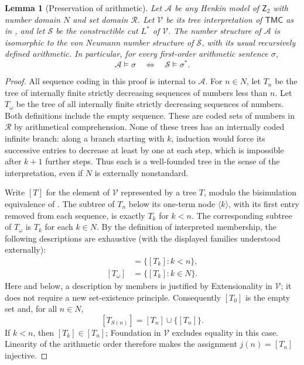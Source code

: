 \documentclass[11pt,a4paper]{article}
\numberwithin{equation}{section}
\newtheorem{lemma}[theorem]{Lemma}
\theoremstyle{definition}
\theoremstyle{remark}
\newcommand{\Ztwo}{\mathsf{Z}_2}
\begin{document}
\begin{lemma}[Preservation of arithmetic]\label{lem:arithmetic-preservation}
Let $\mathcal A$ be any Henkin model of $\Ztwo$ with number domain $N$ and set domain $\mathcal R$. Let $\mathcal V$ be its tree interpretation of $\mathsf{TMC}$ as in \cite[Definition 5.1 and Theorem 5.2]{kl}, and let $\mathcal S$ be the constructible cut $L^*$ of $\mathcal V$. The number structure of $\mathcal A$ is isomorphic to the von Neumann number structure of $\mathcal S$, with its usual recursively defined arithmetic. In particular, for every first-order arithmetic sentence $\sigma$,
\[
\mathcal A\models\sigma
\quad\Longleftrightarrow\quad
\mathcal S\models\sigma^*.
\]
\end{lemma}
\begin{proof}
All sequence coding in this proof is internal to $\mathcal A$. For $n\in N$, let $T_n$ be the tree of internally finite strictly decreasing sequences of numbers less than $n$. Let $T_\omega$ be the tree of all internally finite strictly decreasing sequences of numbers. Both definitions include the empty sequence. These are coded sets of numbers in $\mathcal R$ by arithmetical comprehension. None of these trees has an internally coded infinite branch: along a branch starting with $k$, induction would force its successive entries to decrease at least by one at each step, which is impossible after $k+1$ further steps. Thus each is a well-founded tree in the sense of the interpretation, even if $N$ is externally nonstandard.

Write $[T]$ for the element of $\mathcal V$ represented by a tree $T$, modulo the bisimulation equivalence of \cite[Definition 5.1]{kl}. The subtree of $T_n$ below its one-term node $\langle k\rangle$, with its first entry removed from each sequence, is exactly $T_k$ for $k<n$. The corresponding subtree of $T_\omega$ is $T_k$ for each $k\in N$. By the definition of interpreted membership, the following descriptions are exhaustive (with the displayed families understood externally):
\begin{align*}
[T_n]&=\{[T_k]: k<n\},\\
[T_\omega]&=\{[T_k]: k\in N\}.
\end{align*}
Here and below, a description by members is justified by Extensionality in $\mathcal V$; it does not require a new set-existence principle. Consequently $[T_0]$ is the empty set and, for all $n\in N$,
\[
[T_{S(n)}]=[T_n]\cup\{[T_n]\}.
\]
If $k<n$, then $[T_k]\in[T_n]$; Foundation in $\mathcal V$ excludes equality in this case. Linearity of the arithmetic order therefore makes the assignment $j(n)=[T_n]$ injective.


\end{proof}
\end{document}
